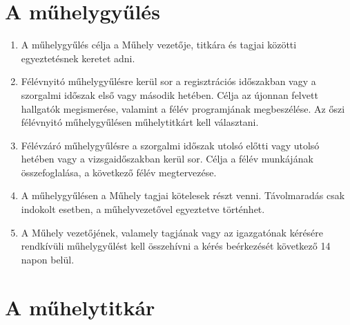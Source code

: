 \documentclass{../styles/rulebook}
\begin{document}
\section{A műhelygyűlés}
\label{par:muhelygyules}

\begin{enumerate}
	\item A műhelygyűlés célja a Műhely vezetője, titkára és tagjai közötti egyeztetésnek keretet adni.
	\item Félévnyitó műhelygyűlésre kerül sor a regisztrációs időszakban vagy a szorgalmi időszak első vagy második hetében. Célja az újonnan felvett hallgatók megismerése, valamint a félév programjának megbeszélése. Az őszi félévnyitó műhelygyűlésen műhelytitkárt kell választani.
	\item Félévzáró műhelygyűlésre a szorgalmi időszak utolsó előtti vagy utolsó hetében vagy a vizsgaidőszakban kerül sor. Célja a félév munkájának összefoglalása, a következő félév megtervezése.
	\item A műhelygyűlésen a Műhely tagjai kötelesek részt venni. Távolmaradás csak indokolt esetben, a műhelyvezetővel egyeztetve történhet.
	\item A Műhely vezetőjének, valamely tagjának vagy az igazgatónak kérésére rendkívüli műhelygyűlést kell összehívni a kérés beérkezését következő 14 napon belül. \label{bek:rendkivuliMuhelygyules}
\end{enumerate}

\section{A műhelytitkár}
\end{document}

